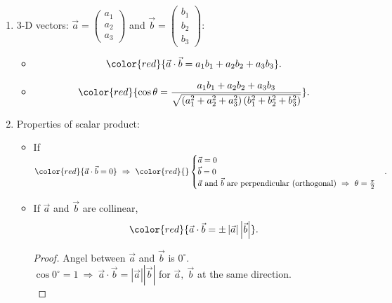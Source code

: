 \documentclass[12pt, a4paper]{article}
\newtheorem{proof}{Proof}[subsection]
\begin{document}
\begin{enumerate}
\begin{itemize}
\begin{proof}
$$\begin{aligned}
        \left|\vec{b}\right|^2-2\vec{a}\vec{b}+\left|\vec{a}\right|^2&=\left|\vec{a}\right|^2+\left|\vec{b}\right|^2-2\left|\vec{a}\right|\left|\vec{b}\right|\cos\theta\\
        \therefore \vec{a}\cdot\vec{b}&=\left|\vec{a}\right|\left|\vec{b}\right|\cos\theta.
      \end{aligned}$$
    \end{proof}
    \item Combining the two definitions: 
    $${\color{red}{\cos\theta=\frac{a_1b_1+a_2b_2}{\sqrt{\left(a_1^2+a_2^2\right)\left(b_1^2+b_2^2\right)}}}}.$$
  \end{itemize}
  \item 3-D vectors: $\vec{a}=\begin{pmatrix}a_1\\a_2\\a_3\end{pmatrix}$ and $\vec{b}=\begin{pmatrix}b_1\\b_2\\b_3\end{pmatrix}$: 
  \begin{itemize}
    \item $${\color{red}{\vec{a}\cdot\vec{b}=a_1b_1+a_2b_2+a_3b_3}}.$$
    \item $${\color{red}{\cos\theta=\frac{a_1b_1+a_2b_2+a_3b_3}{\sqrt{\left(a_1^2+a_2^2+a_3^2\right)\left(b_1^2+b_2^2+b_3^2\right)}}}}.$$
  \end{itemize}
  \item Properties of scalar product: 
  \begin{itemize}
    \item If ${\color{red}{\vec{a}\cdot\vec{b}=0}}\ \Rightarrow\ {\color{red}{}\begin{cases}\vec{a}=0\\\vec{b}=0\\\vec{a}\text{ and }\vec{b}\text{ are perpendicular (orthogonal)}\ \Rightarrow\ \theta=\frac{\pi}{2}\end{cases}}.$
    \item If $\vec{a}$ and $\vec{b}$ are collinear, $${\color{red}{\vec{a}\cdot\vec{b}=\pm\left|\vec{a}\right|\left|\vec{b}\right|}}.$$
    \begin{proof}
      Angel between $\vec{a}$ and $\vec{b}$ is $0^\circ$.\\
      $\cos0^\circ=1\ \Rightarrow\ \vec{a}\cdot\vec{b}=\left|\vec{a}\right|\left|\vec{b}\right|$ for $\vec{a},\ \vec{b}$ at the same direction.\\

\end{proof}
\end{itemize}
\end{enumerate}
\end{document}

